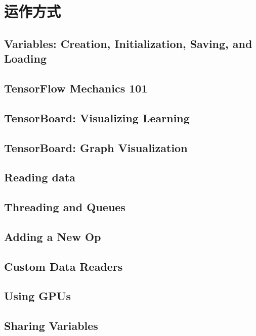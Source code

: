 

\chapter{运作方式}

\section{Variables: Creation, Initialization, Saving, and Loading}



\section{TensorFlow Mechanics 101}

\section{TensorBoard: Visualizing Learning}

\section{TensorBoard: Graph Visualization}

\section{Reading data}

\section{Threading and Queues}

\section{Adding a New Op}

\section{Custom Data Readers}

\section{Using GPUs}

\section{Sharing Variables}